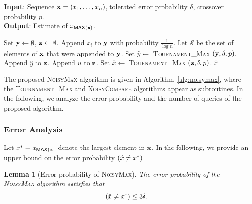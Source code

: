 \documentclass[journal, onecolumn]{IEEEtran}
\theoremstyle{plain}
\newtheorem{lemma}[theorem]{Lemma}
\theoremstyle{definition}
\theoremstyle{remark}
\let\P\relax
\DeclareMathOperator\P{\mathsf{P}}
\newcommand{\stourmax}{\textsc{Tournament\_Max }}
\begin{document}
\begin{algorithm}[t]%
    \caption{Proposed \textsc{NoisyMax} algorithm} \label{alg:noisymax}
    \textbf{Input}: Sequence ${\bf x} = (x_1,\ldots,x_n)$, tolerated error probability $\delta$, crossover probability $p$.\\
    \textbf{Output}: Estimate of $x_{\mathsf{MAX}({\bf x})}$.
    \begin{algorithmic}[1]
        \State Set ${\bf y} \gets \emptyset$, ${\bf z} \gets \emptyset$.
            \State Append $x_i$ to ${\bf y}$ with probability $\frac{1}{\log n}$.
        \EndFor
        \State Let $\mathcal{S}$ be the set of elements of ${\bf x}$ that were appended to ${\bf y}$.
        \State Set $\hat{y}\gets$ \stourmax$({\bf y},\delta,p)$.
        \State Append $\hat{y}$ to ${\bf z}$.
                \State Append $u$ to ${\bf z}$.
            \EndIf
        \EndFor
        \State Set $\hat{x}\gets$ \stourmax$({\bf z},\delta,p)$.
        \State \Return $\hat{x}$
    \end{algorithmic}
\end{algorithm}

The proposed \textsc{NoisyMax} algorithm is given in Algorithm~\ref{alg:noisymax}, where the \stourmax and \textsc{NoisyCompare} algorithms appear as subroutines. In the following, we analyze the error probability and the number of queries of the proposed algorithm.

\vspace{0.5em}
\subsubsection{Error Analysis}
Let $x^{*}= x_{\mathsf{MAX}({\bf x})}$ denote the largest element in ${\bf x}$. In the following, we provide an upper bound on the error probability $\P(\hat{x}\neq x^*)$.

\begin{lemma}[Error probability of \textsc{NoisyMax}] \label{lemma:error-prob-max}
    The error probability of the \textsc{NoisyMax} algorithm satisfies that 
    \[
        \P(\hat{x}\neq x^*)\le 3\delta.
    \]
\end{lemma}
\end{document}
